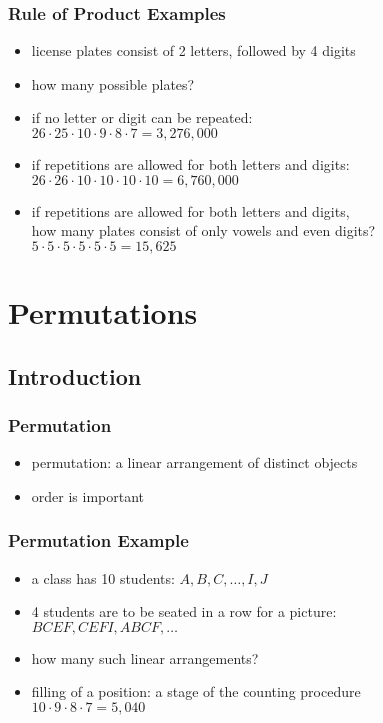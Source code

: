 \documentclass[dvipsnames]{beamer}
\begin{document}
\begin{frame}
  \frametitle{Rule of Product Examples}

  \begin{itemize}
    \item license plates consist of 2 letters, followed by 4 digits
    \item how many possible plates?

    \pause
    \medskip
    \item if no letter or digit can be repeated:\\
      $26 \cdot 25 \cdot 10 \cdot 9 \cdot 8 \cdot 7 = 3,276,000$

    \pause
    \medskip
    \item if repetitions are allowed for both letters and digits:\\
      $26 \cdot 26 \cdot 10 \cdot 10 \cdot 10 \cdot 10 = 6,760,000$

    \pause
    \medskip
    \item if repetitions are allowed for both letters and digits,\\
      how many plates consist of only vowels and even digits?\\
      $5 \cdot 5 \cdot 5 \cdot 5 \cdot 5 \cdot 5 = 15,625$
  \end{itemize}
\end{frame}

\section{Permutations}

\subsection{Introduction}

\begin{frame}
  \frametitle{Permutation}

  \begin{itemize}
    \item \alert{permutation}: a linear arrangement of distinct objects
    \item order is important
  \end{itemize}
\end{frame}

\begin{frame}
  \frametitle{Permutation Example}

  \begin{itemize}
    \item a class has 10 students: $A, B, C, \ldots, I, J$
    \item 4 students are to be seated in a row for a picture:\\
      \smallskip
      $BCEF, CEFI, ABCF, \ldots$
    \item how many such linear arrangements?

    \pause
    \medskip
    \item filling of a position: a stage of the counting procedure\\
      $10 \cdot 9 \cdot 8 \cdot 7 = 5,040$
  \end{itemize}
\end{frame}
\end{document}
